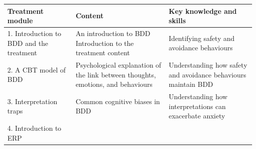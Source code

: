 \documentclass[]{book}
\theoremstyle{definition}
\theoremstyle{definition}
\theoremstyle{definition}
\theoremstyle{remark}
\begin{document}
\begin{longtable}[]{@{}lll@{}}
\toprule
\begin{minipage}[b]{0.33\columnwidth}\raggedright
\textbf{Treatment module}\strut
\end{minipage} & \begin{minipage}[b]{0.33\columnwidth}\raggedright
\textbf{Content}\strut
\end{minipage} & \begin{minipage}[b]{0.25\columnwidth}\raggedright
\textbf{Key knowledge and skills}\strut
\end{minipage}\tabularnewline
\midrule
\endhead
\begin{minipage}[t]{0.33\columnwidth}\raggedright
1. Introduction to BDD and the treatment\strut
\end{minipage} & \begin{minipage}[t]{0.33\columnwidth}\raggedright
An introduction to BDD Introduction to the treatment content\strut
\end{minipage} & \begin{minipage}[t]{0.25\columnwidth}\raggedright
Identifying safety and avoidance behaviours\strut
\end{minipage}\tabularnewline
\begin{minipage}[t]{0.33\columnwidth}\raggedright
2. A CBT model of BDD\strut
\end{minipage} & \begin{minipage}[t]{0.33\columnwidth}\raggedright
Psychological explanation of the link between thoughts, emotions, and
behaviours\strut
\end{minipage} & \begin{minipage}[t]{0.25\columnwidth}\raggedright
Understanding how safety and avoidance behaviours maintain BDD\strut
\end{minipage}\tabularnewline
\begin{minipage}[t]{0.33\columnwidth}\raggedright
3. Interpretation traps\strut
\end{minipage} & \begin{minipage}[t]{0.33\columnwidth}\raggedright
Common cognitive biases in BDD\strut
\end{minipage} & \begin{minipage}[t]{0.25\columnwidth}\raggedright
Understanding how interpretations can exacerbate anxiety\strut
\end{minipage}\tabularnewline
\begin{minipage}[t]{0.33\columnwidth}\raggedright
4. Introduction to ERP\strut

\end{minipage}
\end{longtable}
\end{document}

